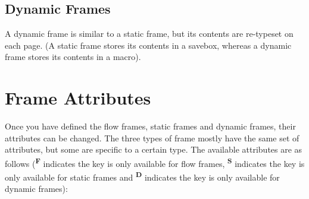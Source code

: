 \documentclass[a4paper,twoside]{report}
\begin{document}
\section{Dynamic Frames}

A dynamic frame is similar to a static frame, but its contents
are re-typeset on each page. (A static frame stores its 
contents in a savebox, whereas a dynamic frame stores its
contents in a macro).

\chapter{Frame Attributes}
\label{sec:modattr}

Once you have defined the {flow frames}, {static frames} and 
{dynamic frames}, their attributes can be changed. 
The three types of frame mostly have the 
same set of attributes, but some are specific to a certain type.
The available attributes are as follows
(\textsuperscript{\textbf{F}} indicates the key is
only available for {flow frames}, 
\textsuperscript{\textbf{S}} indicates the key is only available 
for {static frames}
and \textsuperscript{\textbf{D}} indicates the key
is only available for {dynamic frames}):
\end{document}
